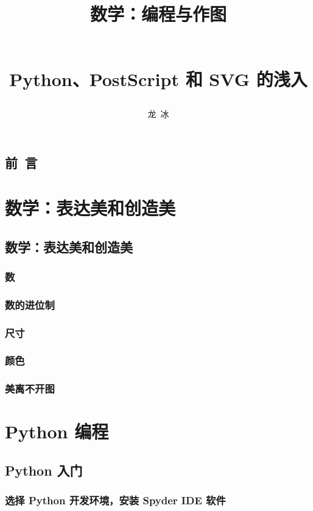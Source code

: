 \documentclass[zihao=-4,heading=true,a4paper,twoside,openany]{ctexbook}
\title{\begin{kaishu}数学：编程与作图\end{kaishu}\\
	Python、PostScript 和 SVG 的浅入}
\author{\kaishu 龙\,  冰}
\date{}
\begin{document}
\begin{titlepage}
	\maketitle
\end{titlepage}
\chapter*{\kaishu 前\, 言}\label{chap:preface}


\tableofcontents

\part{数学：表达美和创造美}\label{part:表达美和创造美}
\chapter{数学：表达美和创造美}\label{chap:1}
\section{数}
\section{数的进位制}
\section{尺寸}
\section{颜色}
\section{美离不开图}

\part{Python 编程}
\chapter{Python 入门}\label{chap2}
\section{选择 Python 开发环境，安装 Spyder IDE 软件}
 \label{chap:2.1}
\end{document}
